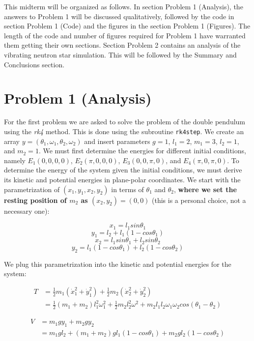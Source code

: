 \documentclass[12pt]{article}
\begin{document}
This midterm will be organized as follows.  In section Problem 1 (Analysis), the answers to Problem 1 will be discussed qualitatively, followed by the code in section Problem 1 (Code) and the figures in the section Problem 1 (Figures).  The length of the code and number of figures required for Problem 1 have warranted them getting their own sections.  Section Problem 2 contains an analysis of the vibrating neutron star simulation.  This will be followed by the Summary and Conclusions section.  

\section{Problem 1 (Analysis)}

For the first problem we are asked to solve the problem of the double pendulum using the \emph{rk4} method.  This is done using the subroutine {\tt rk4step}.  We create an array $y = (\theta_1, \omega_1, \theta_2, \omega_2)$ and insert parameters $g = 1$, $l_1 = 2$, $m_1 = 3$, $l_2 = 1$, and $m_2 = 1$.  We must first determine the energies for different initial conditions, namely $E_1(0,0,0,0)$, $E_2(\pi,0,0,0)$, $E_3(0,0,\pi,0)$, and $E_4(\pi,0,\pi,0)$. To determine the energy of the system given the initial conditions, we must derive its kinetic and potential energies in plane-polar coordinates.  We start with the parametrization of $(x_1, y_1, x_2, y_2)$ in terms of $\theta_1$ and $\theta_2$, \textbf{where we set the resting position of $m_2$ as $(x_2, y_2) = (0, 0)$} (this is a personal choice, not a necessary one):

\[x_1 = l_1 sin \theta_1\]
\[y_1 = l_2 + l_1(1 - cos \theta_1)\]
\[x_2 = l_1 sin \theta_1 + l_2 sin \theta_2\]
\[y_2 = l_1(1 - cos \theta_1) + l_2(1 - cos \theta_2)\]

We plug this parametrization into the kinetic and potential energies for the system:

\begin{align*}
    T &= \frac{1}{2} m_1 (\dot{x}_1^2 + \dot{y}_1^2) + \frac{1}{2} m_2 (\dot{x}_2^2 + \dot{y}_2^2)\\
      &= \frac{1}{2} (m_1 + m_2) l_1^2 \omega_1^2 + \frac{1}{2} m_2 l_2^2 \omega^2 + m_2 l_1 l_2 \omega_1 \omega_2 cos (\theta_1 - \theta_2)
\end{align*}

\begin{align*}
    V &= m_1 g y_1 + m_2 g y_2\\
      &= m_1 g l_2 + (m_1 + m_2) g l_1 (1 - cos \theta_1) + m_2 g l_2 (1 - cos \theta_2)
\end{align*}
\end{document}
